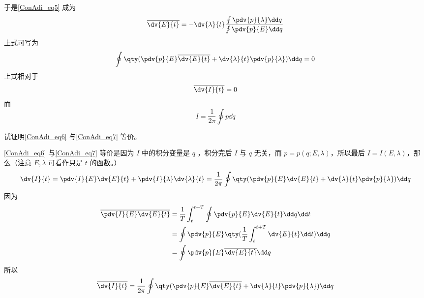 于是\autoref{ConAdi_eq5} 成为
\begin{equation}
\overline{\dv{E}{t}}=-\dv{\lambda}{t}
\frac{\oint\pdv{p}{\lambda}\dd q}
{\oint\pdv{p}{E}\dd q}
\end{equation}
上式可写为
\begin{equation}\label{ConAdi_eq6}
\oint\qty(\pdv{p}{E}\overline{\dv{E}{t}}+\dv{\lambda}{t}\pdv{p}{\lambda})\dd q=0
\end{equation}
上式相对于
\begin{equation}\label{ConAdi_eq7}
\overline{\dv{I}{t}}=0
\end{equation}
而
\begin{equation}
I=\frac{1}{2\pi}\oint p\dd q
\end{equation}
\begin{example}{}
试证明\autoref{ConAdi_eq6} 与\autoref{ConAdi_eq7} 等价。

\autoref{ConAdi_eq6} 与\autoref{ConAdi_eq7} 等价是因为 $I$ 中的积分变量是 $q$ ，积分完后 $I$ 与 $q$ 无关，而 $p=p(q;E,\lambda)$，所以最后 $I=I(E,\lambda)$，那么（注意 $E,\lambda$ 可看作只是 $t$ 的函数。）
\begin{equation}
\dv{I}{t}=\pdv{I}{E}\dv{E}{t}+\pdv{I}{\lambda}\dv{\lambda}{t}=\frac{1}{2\pi}\oint\qty(\pdv{p}{E}\dv{E}{t}+\dv{\lambda}{t}\pdv{p}{\lambda})\dd q
\end{equation}
因为
  \begin{equation}
  \begin{aligned}
\overline{\pdv{I}{E}\dv{E}{t}}&=\frac{1}{T}\int_t^{t+T}\oint\pdv{p}{E}\dv{E}{t}\dd q\dd t\\
&=\oint\pdv{p}{E}\qty(\frac{1}{T}\int_t^{t+T}\dv{E}{t}\dd t)\dd q\\
&=\oint\pdv{p}{E}\overline{\dv{E}{t}}\dd q
\end{aligned}
\end{equation}
所以
\begin{equation}
\overline{\dv{I}{t}}=\frac{1}{2\pi}\oint\qty(\pdv{p}{E}\overline{\dv{E}{t}}+\dv{\lambda}{t}\pdv{p}{\lambda})\dd q
\end{equation}

\end{example}
 